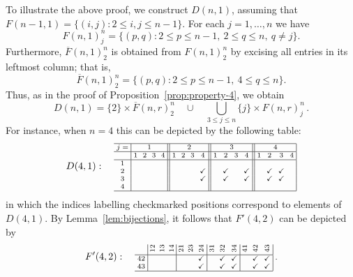 \documentclass[ALCO,ThmDefs,Unicode,epreuves]{cedram}
\newcommand{\ov}{\overline}
\newcommand{\cm}{\checkmark}
\newcommand{\rt}[1]{\rotatebox{90}{#1}}
\begin{document}
\begin{exam}\label{Dn1}
To illustrate the above proof, we construct $D(n,1)$, assuming that
$F(n-1,1) = \{(i,j): 2 \le i,j \le n-1\}$. For each $j=1, \dots,
n$ we have
\[
F(n,1)^n_j = \{ (p,q): 2 \le p \le n-1,\ 2 \le q \le n,\ q \ne j\}.
\]
Furthermore, $\ov{F}(n,1)^n_2$ is obtained from $F(n,1)^n_2$ by
excising all entries in its leftmost column; that is,
\[
\ov{F}(n,1)^n_2 = \{ (p,q): 2 \le p \le n-1,\ 4 \le q \le n\}.
\]
Thus, as in the proof of Proposition~\ref{prop:property-4}, we obtain
\[
D(n,1) = \{2\}\times \ov{F}(n,r)^n_2 \quad\cup\quad \bigcup_{3\leq j
 \leq n}\{j\}\times F(n,r)^n_j \, .
\]
For instance, when $n=4$ this can be depicted by the following table:
\[ D(4,1): \quad
\text{\setlength{\arraycolsep}{2.7pt}\scriptsize
$\displaystyle 
\begin{array}{c|cccc||cccc||cccc||cccc|}
\hline
j=&\multicolumn{4}{c||}{1}	
&\multicolumn{4}{c||}{2}
&\multicolumn{4}{c||}{3}
&\multicolumn{4}{c|}{4}					\\ \hline
 &1&2&3&4 &1&2&3&4 &1&2&3&4 &1&2&3&4 \\ \hline
 1 &&&& &&&& &&&& &&&&\\
 2 &&&& &&&&\cm && \cm&&\cm && \cm&\cm&\\
 3 &&&& &&&&\cm && \cm&&\cm && \cm&\cm&\\ 
 4 &&&& &&&& &&&& &&&&\\ 
 \hline
\end{array}$}
\]
in which the indices labelling checkmarked positions correspond to
elements of $D(4,1)$. By Lemma~\ref{lem:bijections}, it follows that
$F'(4,2)$ can be depicted by
\[
F'(4,2): \quad
\text{\setlength{\arraycolsep}{2.7pt}\scriptsize
$\displaystyle 
\begin{array}{c|ccc|ccc|ccc|ccc|}
 &\rt{12}&\rt{13}&\rt{14}&\rt{21} &\rt{23}&\rt{24}&\rt{31}&\rt{32}
 &\rt{34}&\rt{41}&\rt{42}&\rt{43} \\ \hline
 42 &&&	&&&\cm	&&\cm&\cm	&&\cm&\cm\\ 
 43 &&&	&&&\cm	&&\cm&\cm	&&\cm&\cm\\ 
 \hline
\end{array}\; .$}
\]
\end{exam}
\end{document}
